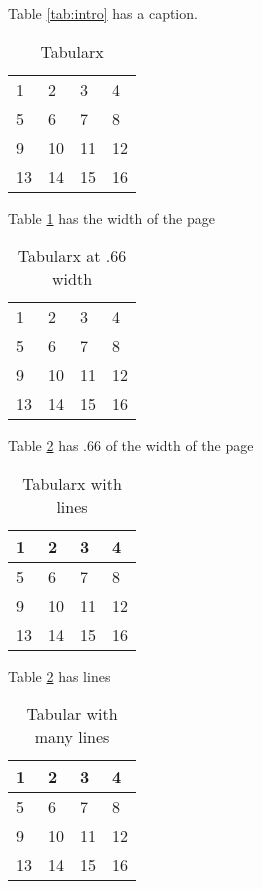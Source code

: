Table \ref{tab:intro} has a caption.


\begin{table}
\begin{tabularx}{\textwidth}{XXXX}
 1&2&3&4\\
 5&6&7&8\\
 9&10&11&12\\
 13&14&15&16
\end{tabularx}
\caption{Tabularx}
\label{tab:tabularx}
\end{table}

Table \ref{tab:tabularx} has the width of the page

\begin{table}
\begin{tabularx}{\textwidth}{XXXX}
 1&2&3&4\\
 5&6&7&8\\
 9&10&11&12\\
 13&14&15&16
\end{tabularx}
\caption{Tabularx at .66 width}
\label{tab:tabularx66}
\end{table}

Table \ref{tab:tabularx66} has .66 of the width of the page



\begin{table}
\begin{tabularx}{\textwidth}{XXXX}
\toprule
 1&2&3&4\\
 \midrule 
 5&6&7&8\\
 9&10&11&12\\
 13&14&15&16\\
 \bottomrule
\end{tabularx}
\caption{Tabularx with lines}
\label{tab:tabularxrules}
\end{table}

Table \ref{tab:tabularx66} has lines



\begin{table}
\begin{tabularx}{\textwidth}{XXXX}
\hline
 1&2&3&4\\
\hline
 5&6&7&8\\
\hline
 9&10&11&12\\
\hline
 13&14&15&16\\
 \hline
\end{tabularx}
\caption{Tabular with many lines}
\label{tab:tabularxhline}
\end{table}



